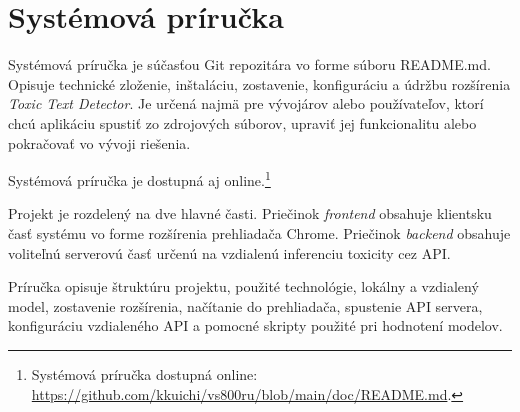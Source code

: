 
\chapter{Systémová príručka}
\label{app:system.manual}

Systémová príručka je súčasťou Git repozitára vo forme súboru \mbox{\textsf{README.md}}. Opisuje technické zloženie, inštaláciu, zostavenie, konfiguráciu a údržbu rozšírenia \textit{Toxic Text Detector}. Je určená najmä pre vývojárov alebo používateľov, ktorí chcú aplikáciu spustiť zo zdrojových súborov, upraviť jej funkcionalitu alebo pokračovať vo vývoji riešenia.

Systémová príručka je dostupná aj online.\footnote{Systémová príručka dostupná online: \url{https://github.com/kkuichi/vs800ru/blob/main/doc/README.md}.}

Projekt je rozdelený na dve hlavné časti. Priečinok \emph{frontend} obsahuje klientsku časť systému vo forme rozšírenia prehliadača Chrome. Priečinok \emph{backend} obsahuje voliteľnú serverovú časť určenú na vzdialenú inferenciu toxicity cez API.

Príručka opisuje štruktúru projektu, použité technológie, lokálny a vzdialený model, zostavenie rozšírenia, načítanie do prehliadača, spustenie API servera, konfiguráciu vzdialeného API a pomocné skripty použité pri hodnotení modelov.